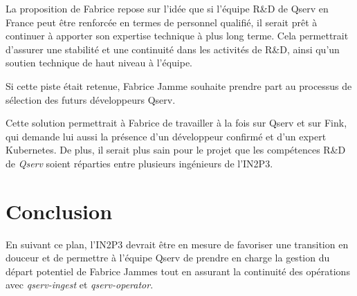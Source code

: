 \documentclass[french] {article}
\begin{document}
La proposition de Fabrice repose sur l'idée que si l'équipe R\&D de Qserv en France peut être renforcée en termes de personnel qualifié, il serait prêt à continuer à apporter son expertise technique
à plus long terme. Cela permettrait d'assurer une stabilité et une continuité dans les activités de R\&D, ainsi qu'un soutien technique de haut niveau à l'équipe.

Si cette piste était retenue, Fabrice Jamme souhaite prendre part au processus de sélection des futurs développeurs Qserv.

Cette solution permettrait à Fabrice de travailler à la fois sur Qserv et sur Fink, qui demande lui aussi la présence d'un développeur confirmé et d'un expert Kubernetes. De plus, il serait plus sain pour le projet que les compétences R\&D de \textit{Qserv} soient réparties entre plusieurs ingénieurs de l'IN2P3.

\section{Conclusion}

En suivant ce plan, l'IN2P3 devrait être en mesure de favoriser une transition en douceur et de permettre à l'équipe Qserv de prendre en charge la gestion du départ potentiel de Fabrice Jammes tout en
assurant la continuité des opérations avec \textit{qserv-ingest} et \textit{qserv-operator}.
\end{document}
